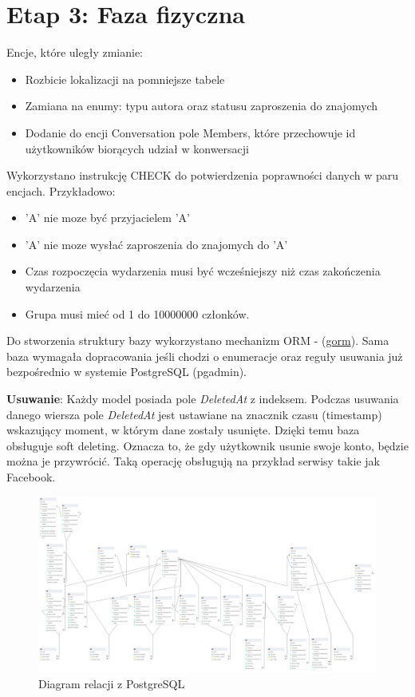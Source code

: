 \documentclass{article}
\begin{document}
\section{Etap 3: Faza fizyczna}

Encje, które uległy zmianie:

\begin{itemize}
    \item Rozbicie lokalizacji na pomniejsze tabele
    \item Zamiana na enumy: typu autora oraz statusu zaproszenia do znajomych
    \item Dodanie do encji Conversation pole Members, które przechowuje id użytkowników biorących udział w konwersacji
\end{itemize}


Wykorzystano instrukcję CHECK do potwierdzenia poprawności danych w paru encjach. Przykładowo:
\begin{itemize}
    \item 'A' nie moze być przyjacielem 'A'
    \item 'A' nie moze wysłać zaproszenia do znajomych do 'A'
    \item Czas rozpoczęcia wydarzenia musi być wcześniejszy niż czas zakończenia wydarzenia
    \item Grupa musi mieć od 1 do 10000000 członków.
\end{itemize}

Do stworzenia struktury bazy wykorzystano mechanizm ORM - (\href{https://gorm.io/}{gorm}). Sama baza wymagała dopracowania jeśli chodzi o enumeracje oraz reguły usuwania już bezpośrednio w systemie PostgreSQL (pgadmin).

\textbf{Usuwanie}: Każdy model posiada pole \textit{DeletedAt} z indeksem. Podczas usuwania danego wiersza pole \textit{DeletedAt} jest ustawiane na znacznik czasu (timestamp) wskazujący moment, w którym dane zostały usunięte. Dzięki temu baza obsługuje soft deleting. Oznacza to, że gdy użytkownik usunie swoje konto, będzie można je przywrócić. Taką operację obsługują na przykład serwisy takie jak Facebook.

\begin{figure}[H]
    \centering
    \includegraphics[width=\linewidth]{images/postgres_diagram.png}
    \caption{Diagram relacji z PostgreSQL}
    \label{fig:postgres}
\end{figure}
\end{document}
